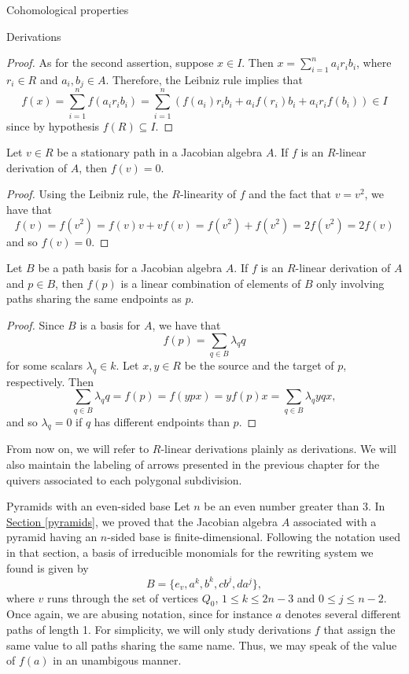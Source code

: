 \begin{chapter}{Cohomological properties}
\begin{section}{Derivations}
\begin{proof}
As for the second assertion, suppose $x\in I$. Then $x=\sum_{i=1}^n a_ir_ib_i$, where $r_i\in R$ and $a_i, b_j\in A$. Therefore, the Leibniz rule implies that
\[f(x) = \sum_{i=1}^n f(a_ir_ib_i)=\sum_{i=1}^n \left(f(a_i)r_ib_i + a_if(r_i)b_i + a_ir_if(b_i)\right)\in I\]
since by hypothesis $f(R)\subseteq I$.
\end{proof}
\begin{obs}\label{derivation-vertices} Let $v\in R$ be a stationary path in a Jacobian algebra $A$. If $f$ is an $R$-linear derivation of $A$, then $f(v)=0$.
\end{obs}
\begin{proof} Using the Leibniz rule, the $R$-linearity of $f$ and the fact that $v=v^2$, we have that
\[f(v)= f(v^2)= f(v)v + vf(v)=f(v^2)+ f(v^2)=2f(v^2)=2f(v)\]
and so $f(v)=0$.
\end{proof}
\begin{obs}\label{endpoints} Let $B$ be a path basis for a Jacobian algebra $A$. If $f$ is an $R$-linear derivation of $A$ and $p\in B$, then $f(p)$ is a linear combination of elements of $B$ only involving paths sharing the same endpoints as $p$.
\end{obs}
\begin{proof} Since $B$ is a basis for $A$, we have that
\[f(p) = \sum_{q\in B} \lambda_q q\]
for some scalars $\lambda_q\in k$. Let $x, y\in R$ be the source and the target of $p$, respectively. Then
\[\sum_{q\in B} \lambda_q q=f(p)=f(ypx) = yf(p)x =\sum_{q\in B} \lambda_q yqx,\]
and so $\lambda_q=0$ if $q$ has different endpoints than $p$.
\end{proof}
From now on, we will refer to $R$-linear derivations plainly as derivations. We will also maintain the labeling of arrows presented in the previous chapter for the quivers associated to each polygonal subdivision.

\begin{subsection}{Pyramids with an even-sided base}
Let $n$ be an even number greater than 3. In \hyperref[pyramids]{Section \ref*{pyramids}}, we proved that the Jacobian algebra $A$ associated with a pyramid having an $n$-sided base is finite-dimensional. Following the notation used in that section, a basis of irreducible monomials for the rewriting system we found is given by
\[B=\{e_v,a^k,b^k,cb^j, da^j\},\] 
where $v$ runs through the set of vertices $Q_0$, $1\leq k\leq 2n-3$ and $0\leq j\leq n-2$. Once again, we are abusing notation, since for instance $a$ denotes several different paths of length 1. For simplicity, we will only study derivations $f$ that assign the same value to all paths sharing the same name. Thus, we may speak of the value of $f(a)$ in an unambigous manner.


\end{subsection}
\end{section}
\end{chapter}
